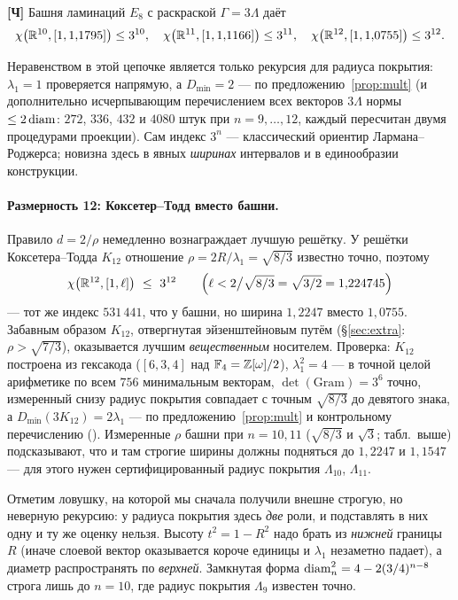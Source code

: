 \begin{keybox}
\textbf{[Ч]} Башня ламинаций $E_8$ с раскраской $\Gamma=3\Lambda$ даёт
\[
\chi\bigl(\mathbb{R}^{10},[1,1{,}1795]\bigr)\le3^{10},\quad
\chi\bigl(\mathbb{R}^{11},[1,1{,}1166]\bigr)\le3^{11},\quad
\chi\bigl(\mathbb{R}^{12},[1,1{,}0755]\bigr)\le3^{12}.
\]
\end{keybox}

Неравенством в этой цепочке является только рекурсия для радиуса покрытия:
$\lambda_1=1$ проверяется напрямую, а $D_{\min}=2$ --- по
предложению~\ref{prop:mult} (и дополнительно исчерпывающим перечислением всех
векторов $3\Lambda$ нормы $\le2\operatorname{diam}$: $272$, $336$, $432$ и $4080$ штук при
$n=9,\dots,12$, каждый пересчитан двумя процедурами проекции). Сам индекс
$3^n$ --- классический ориентир Лармана--Роджерса; новизна здесь в явных
\emph{ширинах} интервалов и в единообразии конструкции.

\paragraph{Размерность 12: Коксетер--Тодд вместо башни.}
Правило $d=2/\rho$ немедленно вознаграждает лучшую решётку. У решётки
Коксетера--Тодда $K_{12}$ отношение $\rho=2R/\lambda_1=\sqrt{8/3}$ известно
точно, поэтому
\[
\chi\bigl(\mathbb{R}^{12},[1,\ell]\bigr)\ \le\ 3^{12}
\qquad\Bigl(\ell<2\big/\sqrt{8/3}=\sqrt{3/2}=1{,}224745\Bigr)
\]
--- тот же индекс $531\,441$, что у башни, но ширина $1{,}2247$ вместо
$1{,}0755$. Забавным образом $K_{12}$, отвергнутая эйзенштейновым путём
(\S\ref{sec:extra}: $\rho>\sqrt{7/3}$), оказывается лучшим \emph{вещественным}
носителем. Проверка: $K_{12}$ построена из гексакода
($[6,3,4]$ над $\mathbb F_4=\mathbb{Z}[\omega]/2$), $\lambda_1^2=4$ --- в точной целой
арифметике по всем $756$ минимальным векторам, $\det(\mathrm{Gram})=3^6$
точно, измеренный снизу радиус покрытия совпадает с точным $\sqrt{8/3}$ до
девятого знака, а $D_{\min}(3K_{12})=2\lambda_1$ --- по
предложению~\ref{prop:mult} и контрольному перечислению
(). Измеренные $\rho$ башни при $n=10,11$
($\sqrt{8/3}$ и $\sqrt3$; табл.\ выше) подсказывают, что и там строгие ширины
должны подняться до $1{,}2247$ и $1{,}1547$ --- для этого нужен
сертифицированный радиус покрытия $\Lambda_{10}$, $\Lambda_{11}$.

Отметим ловушку, на которой мы сначала получили внешне строгую, но неверную
рекурсию: у радиуса покрытия здесь \emph{две} роли, и подставлять в них одну и ту
же оценку нельзя. Высоту $t^2=1-R^2$ надо брать из \emph{нижней} границы $R$
(иначе слоевой вектор оказывается короче единицы и $\lambda_1$ незаметно падает),
а диаметр распространять по \emph{верхней}. Замкнутая форма
$\operatorname{diam}^2_n=4-2(3/4)^{n-8}$ строга лишь до $n=10$, где радиус покрытия
$\Lambda_9$ известен точно.

